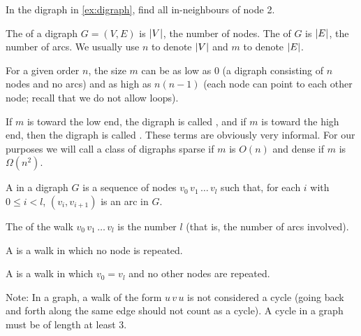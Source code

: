 \begin{Boxample}[2]
In the digraph in \cref{ex:digraph}, find all in-neighbours of node 2.
\end{Boxample}


%


\begin{Definition} 
The  of a digraph $G = (V, E)$ is $\lvert V\rvert$, the number of nodes. 
The  of $G$ is $\lvert E\rvert$, the number of arcs. 
We usually use $n$ to denote $\lvert V\rvert$ and $m$ to denote $\lvert E\rvert$.
\end{Definition}
 

For a given order $n$, the size $m$ can be as low as $0$ (a digraph consisting of $n$ nodes and no arcs)  
and as high as $n(n-1)$ (each node can point to each other node; recall that we do not allow loops).

\begin{Definition}  
If $m$ is toward the low end, the digraph is called , 
and if $m$ is toward the high end, then the digraph is called . 
These terms are obviously very informal. 
For our purposes we will call a class of digraphs sparse if $m$ is $O(n)$ and dense if $m$ is $\Omega(n^2)$.
\end{Definition}


\begin{Definition} 
A  in a digraph $G$ is a sequence of nodes $v_0\, v_1\, \ldots\, v_l$ 
such that, for each $i$ with $0 \leq i < l$, $(v_i, v_{i+1})$ is an arc in $G$. 

The  of the walk $v_0\, v_1\, \ldots \,v_l$ is the number $l$ (that is, the number of arcs involved).

A  is a walk in which no node is repeated. 

A  is a walk in which $v_0 = v_l$ and no other nodes
are repeated.
\end{Definition}

Note: In a graph, a walk of the form $u\, v\, u$ is not considered a cycle 
(going back and forth along the same edge should not count as a cycle). 
A cycle in a graph must be of length at least $3$.


